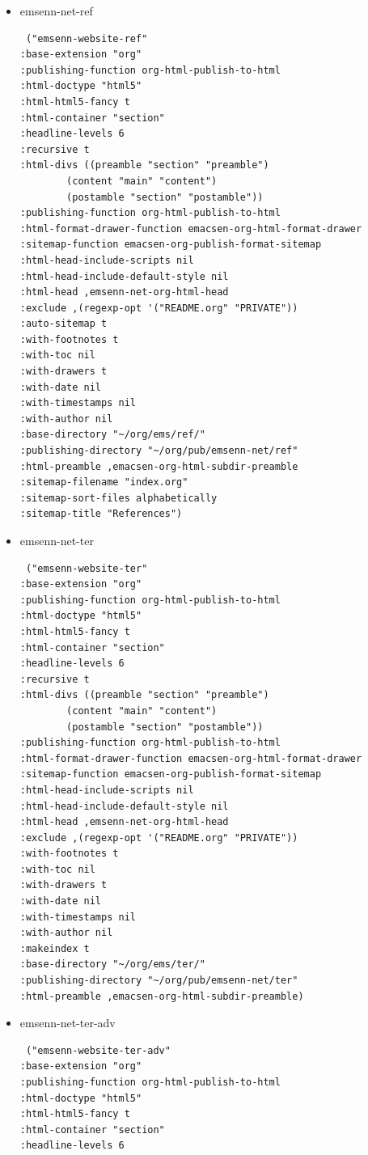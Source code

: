 \documentclass[11pt]{article}
\begin{document}
\begin{itemize}
\begin{itemize}
\begin{itemize}
\begin{itemize}
\begin{verbatim}
\end{verbatim}
\item emsenn-net-ref
\label{sec:orgd40ac64}
\begin{verbatim}
 ("emsenn-website-ref"
:base-extension "org"
:publishing-function org-html-publish-to-html
:html-doctype "html5"
:html-html5-fancy t
:html-container "section"
:headline-levels 6
:recursive t
:html-divs ((preamble "section" "preamble")
	    (content "main" "content")
	    (postamble "section" "postamble"))
:publishing-function org-html-publish-to-html
:html-format-drawer-function emacsen-org-html-format-drawer
:sitemap-function emacsen-org-publish-format-sitemap
:html-head-include-scripts nil
:html-head-include-default-style nil
:html-head ,emsenn-net-org-html-head
:exclude ,(regexp-opt '("README.org" "PRIVATE"))
:auto-sitemap t
:with-footnotes t
:with-toc nil
:with-drawers t
:with-date nil
:with-timestamps nil
:with-author nil
:base-directory "~/org/ems/ref/"
:publishing-directory "~/org/pub/emsenn-net/ref"
:html-preamble ,emacsen-org-html-subdir-preamble
:sitemap-filename "index.org"
:sitemap-sort-files alphabetically
:sitemap-title "References")
\end{verbatim}
\item emsenn-net-ter
\label{sec:org98cef65}
\begin{verbatim}
 ("emsenn-website-ter"
:base-extension "org"
:publishing-function org-html-publish-to-html
:html-doctype "html5"
:html-html5-fancy t
:html-container "section"
:headline-levels 6
:recursive t
:html-divs ((preamble "section" "preamble")
	    (content "main" "content")
	    (postamble "section" "postamble"))
:publishing-function org-html-publish-to-html
:html-format-drawer-function emacsen-org-html-format-drawer
:sitemap-function emacsen-org-publish-format-sitemap
:html-head-include-scripts nil
:html-head-include-default-style nil
:html-head ,emsenn-net-org-html-head
:exclude ,(regexp-opt '("README.org" "PRIVATE"))
:with-footnotes t
:with-toc nil
:with-drawers t
:with-date nil
:with-timestamps nil
:with-author nil
:makeindex t
:base-directory "~/org/ems/ter/"
:publishing-directory "~/org/pub/emsenn-net/ter"
:html-preamble ,emacsen-org-html-subdir-preamble)
\end{verbatim}
\item emsenn-net-ter-adv
\label{sec:org9c16a59}
\begin{verbatim}
 ("emsenn-website-ter-adv"
:base-extension "org"
:publishing-function org-html-publish-to-html
:html-doctype "html5"
:html-html5-fancy t
:html-container "section"
:headline-levels 6

\end{verbatim}
\end{itemize}
\end{itemize}
\end{itemize}
\end{itemize}
\end{document}
